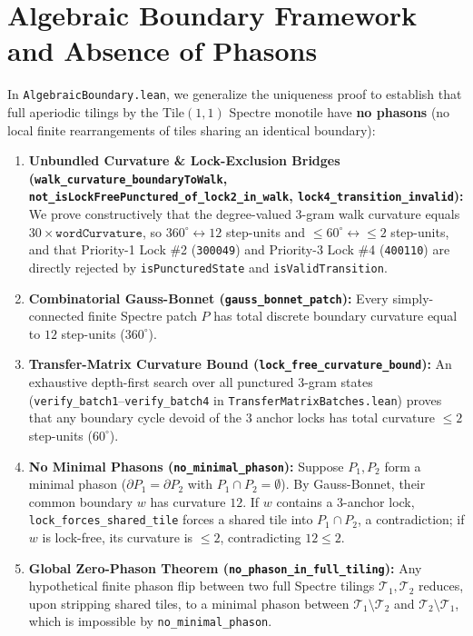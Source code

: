 \documentclass[11pt,a4paper]{article}
\begin{document}
\section{Algebraic Boundary Framework and Absence of Phasons}
\label{sec:phasons}
In \texttt{AlgebraicBoundary.lean}, we generalize the uniqueness proof to establish that full aperiodic tilings by the $\mathrm{Tile}(1,1)$ Spectre monotile have \textbf{no phasons} (no local finite rearrangements of tiles sharing an identical boundary):
\begin{enumerate}
\item \textbf{Unbundled Curvature \& Lock-Exclusion Bridges (\texttt{walk\_curvature\_boundaryToWalk}, \texttt{not\_isLockFreePunctured\_of\_lock2\_in\_walk}, \texttt{lock4\_transition\_invalid}):} We prove constructively that the degree-valued 3-gram walk curvature equals $30 \times \texttt{wordCurvature}$, so $360^\circ \leftrightarrow 12$ step-units and $\le 60^\circ \leftrightarrow \le 2$ step-units, and that Priority-1 Lock \#2 (\texttt{300049}) and Priority-3 Lock \#4 (\texttt{400110}) are directly rejected by \texttt{isPuncturedState} and \texttt{isValidTransition}.
\item \textbf{Combinatorial Gauss-Bonnet (\texttt{gauss\_bonnet\_patch}):} Every simply-connected finite Spectre patch $P$ has total discrete boundary curvature equal to $12$ step-units ($360^\circ$).
\item \textbf{Transfer-Matrix Curvature Bound (\texttt{lock\_free\_curvature\_bound}):} An exhaustive depth-first search over all punctured 3-gram states (\texttt{verify\_batch1}--\texttt{verify\_batch4} in \texttt{TransferMatrixBatches.lean}) proves that any boundary cycle devoid of the 3 anchor locks has total curvature $\le 2$ step-units ($60^\circ$).
\item \textbf{No Minimal Phasons (\texttt{no\_minimal\_phason}):} Suppose $P_1, P_2$ form a minimal phason ($\partial P_1 = \partial P_2$ with $P_1 \cap P_2 = \emptyset$). By Gauss-Bonnet, their common boundary $w$ has curvature $12$. If $w$ contains a 3-anchor lock, \texttt{lock\_forces\_shared\_tile} forces a shared tile into $P_1 \cap P_2$, a contradiction; if $w$ is lock-free, its curvature is $\le 2$, contradicting $12 \le 2$.
\item \textbf{Global Zero-Phason Theorem (\texttt{no\_phason\_in\_full\_tiling}):} Any hypothetical finite phason flip between two full Spectre tilings $\mathcal{T}_1, \mathcal{T}_2$ reduces, upon stripping shared tiles, to a minimal phason between $\mathcal{T}_1 \setminus \mathcal{T}_2$ and $\mathcal{T}_2 \setminus \mathcal{T}_1$, which is impossible by \texttt{no\_minimal\_phason}.
\end{enumerate}
\end{document}
